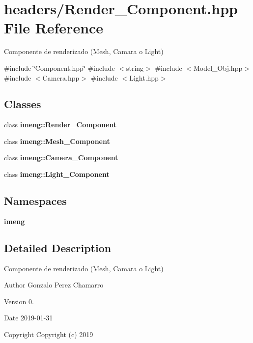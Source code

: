 \section{headers/\+Render\+\_\+\+Component.hpp File Reference}
\label{_render___component_8hpp}


Componente de renderizado (Mesh, Camara o Light)  


{\ttfamily \#include \char`\"{}Component.\+hpp\char`\"{}}\newline
{\ttfamily \#include $<$string$>$}\newline
{\ttfamily \#include $<$Model\+\_\+\+Obj.\+hpp$>$}\newline
{\ttfamily \#include $<$Camera.\+hpp$>$}\newline
{\ttfamily \#include $<$Light.\+hpp$>$}\newline
\subsection*{Classes}
\begin{DoxyCompactItemize}
\item 
class \textbf{ imeng\+::\+Render\+\_\+\+Component}
\item 
class \textbf{ imeng\+::\+Mesh\+\_\+\+Component}
\item 
class \textbf{ imeng\+::\+Camera\+\_\+\+Component}
\item 
class \textbf{ imeng\+::\+Light\+\_\+\+Component}
\end{DoxyCompactItemize}
\subsection*{Namespaces}
\begin{DoxyCompactItemize}
\item 
 \textbf{ imeng}
\end{DoxyCompactItemize}


\subsection{Detailed Description}
Componente de renderizado (Mesh, Camara o Light) 

\begin{DoxyAuthor}{Author}
Gonzalo Perez Chamarro 
\end{DoxyAuthor}
\begin{DoxyVersion}{Version}
0. 
\end{DoxyVersion}
\begin{DoxyDate}{Date}
2019-\/01-\/31
\end{DoxyDate}
\begin{DoxyCopyright}{Copyright}
Copyright (c) 2019 
\end{DoxyCopyright}
